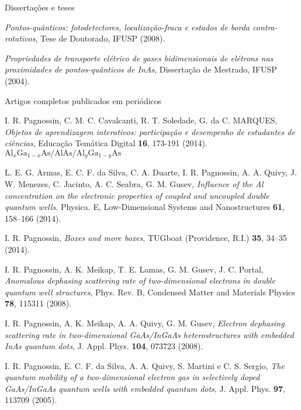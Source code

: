\begin{compactitem}

  \item Dissertações e teses
  \begin{compactitem}
    \item \textsl{Pontos-quânticos: fotodetectores, localização-fraca e estados de borda contra-rotativos}, Tese de Doutorado, IFUSP (2008).
    \item \textsl{Propriedades de transporte elétrico de gases bidimensionais de elétrons nas proximidades de pontos-quânticos de InAs}, Dissertação de Mestrado, IFUSP (2004).
  \end{compactitem}

  \item Artigos completos publicados em periódicos
  \begin{compactitem}
    \item I. R. Pagnossin, C. M. C. Cavalcanti, R. T. Soledade, G. da C. MARQUES, \textsl{Objetos de aprendizagem interativos: participação e desempenho de estudantes de ciências}, Educação Temática Digital \textbf{16}, 173-191 (2014).
    $\text{Al}_x\text{Ga}_{1-x}\text{As}/\text{AlAs}/\text{Al}_y\text{Ga}_{1-y}\text{As}$
    \item L. E. G. Armas, E. C. F. da Silva, C. A. Duarte, I. R. Pagnossin, A. A. Quivy, J. W. Menezes, C. Jacinto, A. C. Seabra, G. M. Gusev, \textsl{Influence of the Al concentration on the electronic properties of coupled and uncoupled
     double quantum wells}. 
    Physica. E, Low-Dimensional Systems and Nanostructures \textbf{61}, 158--166 (2014).
    \item I. R. Pagnossin, \textsl{Boxes and more boxes}, TUGboat (Providence, R.I.) \textbf{35}, 34--35 (2014).
    \item I. R. Pagnossin, A. K. Meikap, T. E. Lamas, G. M. Gusev, J. C. Portal, \textsl{Anomalous dephasing scattering rate of two-dimensional electrons in double quantum well structures}, Phys. Rev. B, Condensed Matter and Materials Physics \textbf{78}, 115311 (2008). 
    \item I. R. Pagnossin, A. K. Meikap, A. A. Quivy, G. M. Gusev, \textsl{Electron dephasing scattering rate in two-dimensional GaAs/InGaAs heterostructures with embedded InAs quantum dots}, J. Appl. Phys. \textbf{104}, 073723 (2008).
    \item I. R. Pagnossin, E. C. F. da Silva, A. A. Quivy, S. Martini e C. S. Sergio, \textsl{The quantum mobility of a two-dimensional electron gas in selectively doped GaAs/InGaAs quantum wells with embedded quantum dots}, J. Appl. Phys. \textbf{97}, 113709 (2005).
  \end{compactitem}
		

\end{compactitem}
